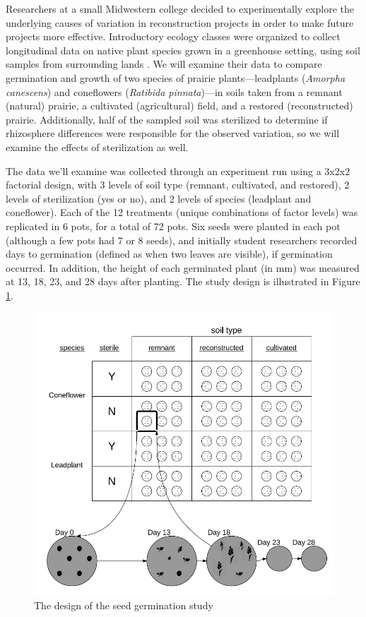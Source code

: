 \documentclass[
]{krantz}
\begin{document}
Researchers at a small Midwestern college decided to experimentally explore the underlying causes of variation in reconstruction projects in order to make future projects more effective. Introductory ecology classes were organized to collect longitudinal data on native plant species grown in a greenhouse setting, using soil samples from surrounding lands \citep{Angell2010}. We will examine their data to compare germination and growth of two species of prairie plants---leadplants (\emph{Amorpha canescens}) and coneflowers (\emph{Ratibida pinnata})---in soils taken from a remnant (natural) prairie, a cultivated (agricultural) field, and a restored (reconstructed) prairie. Additionally, half of the sampled soil was sterilized to determine if rhizosphere differences were responsible for the observed variation, so we will examine the effects of sterilization as well.

The data we'll examine was collected through an experiment run using a 3x2x2 factorial design, with 3 levels of soil type (remnant, cultivated, and restored), 2 levels of sterilization (yes or no), and 2 levels of species (leadplant and coneflower). Each of the 12 treatments (unique combinations of factor levels) was replicated in 6 pots, for a total of 72 pots. Six seeds were planted in each pot (although a few pots had 7 or 8 seeds), and initially student researchers recorded days to germination (defined as when two leaves are visible), if germination occurred. In addition, the height of each germinated plant (in mm) was measured at 13, 18, 23, and 28 days after planting. The study design is illustrated in Figure \ref{fig:seedstudy}.

\begin{figure}
\includegraphics[width=0.8\linewidth]{data/StudyDesignDiagram} \caption{The design of the seed germination study}\label{fig:seedstudy}
\end{figure}
\end{document}

